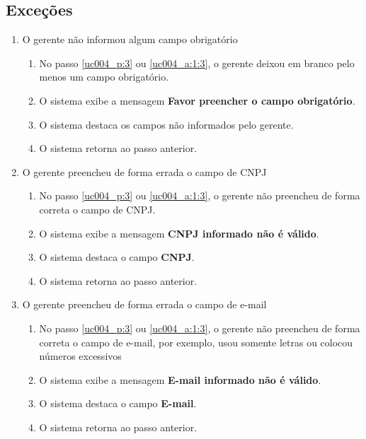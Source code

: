 \subsection{Exceções}

\begin{enumerate}[label=E\arabic*]	
	\item O gerente não informou algum campo obrigatório \label{uc004_e:1}
	\begin{enumerate}[label*=.\arabic*]
		\item[] No passo \ref{uc004_p:3} ou \ref{uc004_a:1:3}, o gerente deixou em branco pelo menos um campo obrigatório.
		\item O sistema exibe a mensagem \textbf{Favor preencher o campo obrigatório}.
		\item O sistema destaca os campos não informados pelo gerente.
		\item O sistema retorna ao passo anterior.
	\end{enumerate}
	
	\item O gerente preencheu de forma errada o campo de CNPJ \label{uc004_e:2}
	\begin{enumerate}[label*=.\arabic*]		
		\item[] No passo \ref{uc004_p:3} ou \ref{uc004_a:1:3}, o gerente não preencheu de forma correta o campo de CNPJ.		
		\item O sistema exibe a mensagem \textbf{CNPJ informado não é válido}.
		\item O sistema destaca o campo \textbf{CNPJ}.
		\item O sistema retorna ao passo anterior.
	\end{enumerate}
	
	\item O gerente preencheu de forma errada o campo de e-mail \label{uc004_e:3}
	\begin{enumerate}[label*=.\arabic*]		
		\item[] No passo \ref{uc004_p:3} ou \ref{uc004_a:1:3}, o gerente não preencheu de forma correta o campo de e-mail, por exemplo, usou somente letras ou colocou números excessivos	
		\item O sistema exibe a mensagem \textbf{E-mail informado não é válido}.
		\item O sistema destaca o campo \textbf{E-mail}.
		\item O sistema retorna ao passo anterior.
	\end{enumerate}
	

\end{enumerate}
